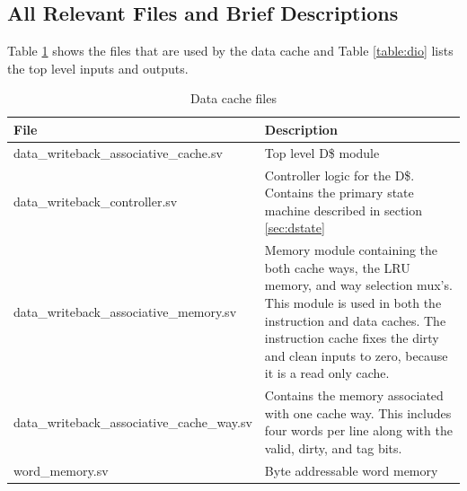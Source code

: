 \subsection{All Relevant Files and Brief Descriptions}

	Table \ref{table:drel} shows the files that are used by the data cache and Table \ref{table:dio} lists the top level inputs and outputs.

	\begin{table}
	\label{table:drel}
	\begin{tabular}{|l|p{70mm}|}
	\hline File  & Description \\ 
	\hline  data\_writeback\_associative\_cache.sv & Top level D\$ module \\ 
	\hline  data\_writeback\_controller.sv & Controller logic for the D\$.
	Contains the primary state machine described in section \ref{sec:dstate} \\ 
	\hline  data\_writeback\_associative\_memory.sv & 
	Memory module containing the both cache ways, the LRU memory, and way selection mux's.
	This module is used in both the instruction and data caches.
	The instruction cache fixes the dirty and clean inputs to zero, because it is a read only cache.\\ 
	\hline  data\_writeback\_associative\_cache\_way.sv & 
	Contains the memory associated with one cache way. This includes four words per line along with the valid, dirty, and tag bits. \\ 
	\hline  word\_memory.sv & Byte addressable word memory  \\
	\hline
	\end{tabular} 
	\caption{Data cache files}
	\end{table}

